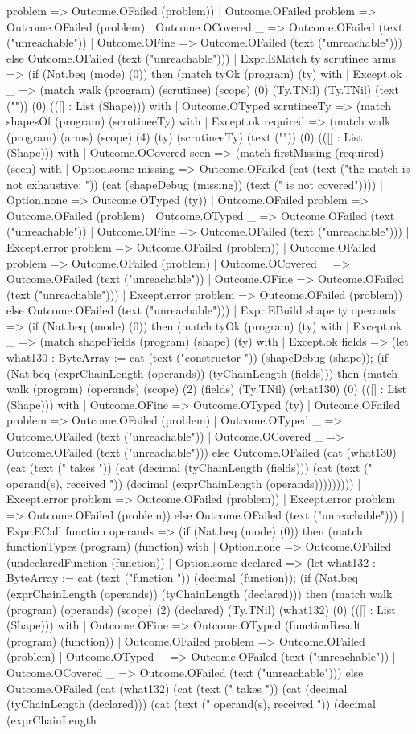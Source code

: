 \documentclass[11pt]{article}
\begin{document}
problem => Outcome.OFailed (problem)) | Outcome.OFailed problem => Outcome.OFailed (problem) | Outcome.OCovered \_ => Outcome.OFailed (text ("unreachable")) | Outcome.OFine => Outcome.OFailed (text ("unreachable"))) else Outcome.OFailed (text ("unreachable"))) | Expr.EMatch ty scrutinee arms => (if (Nat.beq (mode) (0)) then (match tyOk (program) (ty) with | Except.ok \_ => (match walk (program) (scrutinee) (scope) (0) (Ty.TNil) (Ty.TNil) (text ("")) (0) (([] : List (Shape))) with | Outcome.OTyped scrutineeTy => (match shapesOf (program) (scrutineeTy) with | Except.ok required => (match walk (program) (arms) (scope) (4) (ty) (scrutineeTy) (text ("")) (0) (([] : List (Shape))) with | Outcome.OCovered seen => (match firstMissing (required) (seen) with | Option.some missing => Outcome.OFailed (cat (text ("the match is not exhaustive: ")) (cat (shapeDebug (missing)) (text (" is not covered")))) | Option.none => Outcome.OTyped (ty)) | Outcome.OFailed problem => Outcome.OFailed (problem) | Outcome.OTyped \_ => Outcome.OFailed (text ("unreachable")) | Outcome.OFine => Outcome.OFailed (text ("unreachable"))) | Except.error problem => Outcome.OFailed (problem)) | Outcome.OFailed problem => Outcome.OFailed (problem) | Outcome.OCovered \_ => Outcome.OFailed (text ("unreachable")) | Outcome.OFine => Outcome.OFailed (text ("unreachable"))) | Except.error problem => Outcome.OFailed (problem)) else Outcome.OFailed (text ("unreachable"))) | Expr.EBuild shape ty operands => (if (Nat.beq (mode) (0)) then (match tyOk (program) (ty) with | Except.ok \_ => (match shapeFields (program) (shape) (ty) with | Except.ok fields => (let what130 : ByteArray := cat (text ("constructor ")) (shapeDebug (shape)); (if (Nat.beq (exprChainLength (operands)) (tyChainLength (fields))) then (match walk (program) (operands) (scope) (2) (fields) (Ty.TNil) (what130) (0) (([] : List (Shape))) with | Outcome.OFine => Outcome.OTyped (ty) | Outcome.OFailed problem => Outcome.OFailed (problem) | Outcome.OTyped \_ => Outcome.OFailed (text ("unreachable")) | Outcome.OCovered \_ => Outcome.OFailed (text ("unreachable"))) else Outcome.OFailed (cat (what130) (cat (text (" takes ")) (cat (decimal (tyChainLength (fields))) (cat (text (" operand(s), received ")) (decimal (exprChainLength (operands))))))))) | Except.error problem => Outcome.OFailed (problem)) | Except.error problem => Outcome.OFailed (problem)) else Outcome.OFailed (text ("unreachable"))) | Expr.ECall function operands => (if (Nat.beq (mode) (0)) then (match functionTypes (program) (function) with | Option.none => Outcome.OFailed (undeclaredFunction (function)) | Option.some declared => (let what132 : ByteArray := cat (text ("function ")) (decimal (function)); (if (Nat.beq (exprChainLength (operands)) (tyChainLength (declared))) then (match walk (program) (operands) (scope) (2) (declared) (Ty.TNil) (what132) (0) (([] : List (Shape))) with | Outcome.OFine => Outcome.OTyped (functionResult (program) (function)) | Outcome.OFailed problem => Outcome.OFailed (problem) | Outcome.OTyped \_ => Outcome.OFailed (text ("unreachable")) | Outcome.OCovered \_ => Outcome.OFailed (text ("unreachable"))) else Outcome.OFailed (cat (what132) (cat (text (" takes ")) (cat (decimal (tyChainLength (declared))) (cat (text (" operand(s), received ")) (decimal (exprChainLength 
\end{document}
